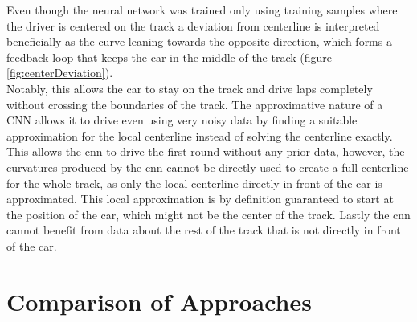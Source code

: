 Even though the neural network was trained only using training samples where the driver is centered on the track a deviation from centerline is interpreted beneficially as the curve leaning towards the opposite direction, which forms a feedback loop that keeps the car in the middle of the track (figure \ref{fig:centerDeviation}).
\\Notably, this allows the car to stay on the track and drive laps completely without crossing the boundaries of the track. The approximative nature of a CNN allows it to drive even using very noisy data by finding a suitable approximation for the local centerline instead of solving the centerline exactly. This allows the \ac{cnn} to drive the first round without any prior data, however, the curvatures produced by the \ac{cnn} cannot be directly used to create a full centerline for the whole track, as only the local centerline directly in front of the car is approximated. This local approximation is by definition guaranteed to start at the position of the car, which might not be the center of the track. Lastly the \ac{cnn} cannot benefit from data about the rest of the track that is not directly in front of the car.


\section{Comparison of Approaches}

